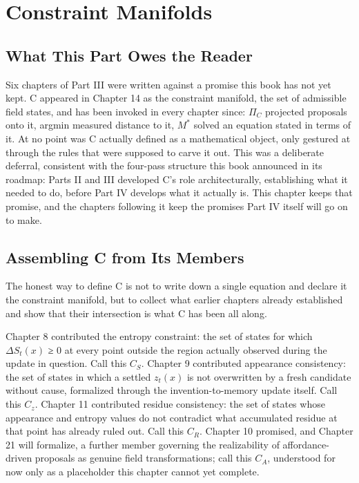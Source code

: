 \chapter{Constraint Manifolds}

\section{What This Part Owes the Reader}

Six chapters of Part III were written against a promise this book has not yet kept. C appeared in Chapter 14 as the constraint manifold, the set of admissible field states, and has been invoked in every chapter since: \(\Pi_C\) projected proposals onto it, argmin measured distance to it, \(M^*\) solved an equation stated in terms of it. At no point was C actually defined as a mathematical object, only gestured at through the rules that were supposed to carve it out. This was a deliberate deferral, consistent with the four-pass structure this book announced in its roadmap: Parts II and III developed C's role architecturally, establishing what it needed to do, before Part IV develops what it actually is. This chapter keeps that promise, and the chapters following it keep the promises Part IV itself will go on to make.

\section{Assembling C from Its Members}

The honest way to define C is not to write down a single equation and declare it the constraint manifold, but to collect what earlier chapters already established and show that their intersection is what C has been all along.

Chapter 8 contributed the entropy constraint: the set of states for which \(\Delta S_t(x)\) ≥ 0 at every point outside the region actually observed during the update in question. Call this \(C_S\). Chapter 9 contributed appearance consistency: the set of states in which a settled \(z_t(x)\) is not overwritten by a fresh candidate without cause, formalized through the invention-to-memory update itself. Call this \(C_z\). Chapter 11 contributed residue consistency: the set of states whose appearance and entropy values do not contradict what accumulated residue at that point has already ruled out. Call this \(C_R\). Chapter 10 promised, and Chapter 21 will formalize, a further member governing the realizability of affordance-driven proposals as genuine field transformations; call this \(C_A\), understood for now only as a placeholder this chapter cannot yet complete.

